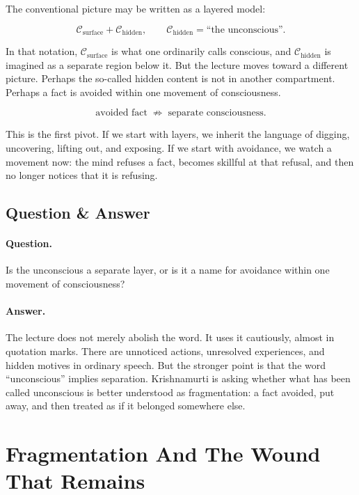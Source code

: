 The conventional picture may be written as a layered model:

\begin{equation}
\mathcal{C}_{\text{surface}} + \mathcal{C}_{\text{hidden}},
\qquad
\mathcal{C}_{\text{hidden}} = \text{``the unconscious''}.
\end{equation}

In that notation, \(\mathcal{C}_{\text{surface}}\) is what one ordinarily calls conscious, and \(\mathcal{C}_{\text{hidden}}\) is imagined as a separate region below it. But the lecture moves toward a different picture. Perhaps the so-called hidden content is not in another compartment. Perhaps a fact is avoided within one movement of consciousness.

\begin{equation}
\text{avoided fact} \;\not\Rightarrow\; \text{separate consciousness}.
\end{equation}

This is the first pivot. If we start with layers, we inherit the language of digging, uncovering, lifting out, and exposing. If we start with avoidance, we watch a movement now: the mind refuses a fact, becomes skillful at that refusal, and then no longer notices that it is refusing.

\subsection{Question \& Answer}

\paragraph{Question.}
Is the unconscious a separate layer, or is it a name for avoidance within one movement of consciousness?

\paragraph{Answer.}
The lecture does not merely abolish the word. It uses it cautiously, almost in quotation marks. There are unnoticed actions, unresolved experiences, and hidden motives in ordinary speech. But the stronger point is that the word ``unconscious'' implies separation. Krishnamurti is asking whether what has been called unconscious is better understood as fragmentation: a fact avoided, put away, and then treated as if it belonged somewhere else.

\section{Fragmentation And The Wound That Remains}

